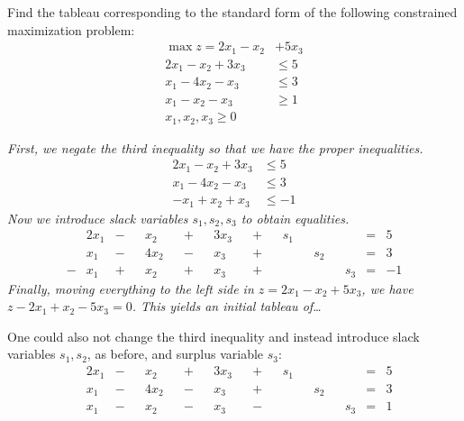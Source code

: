 \documentclass[12pt,letterpaper]{exam}
\begin{document}
\begin{questions}
\newpage
\question[10] Find the tableau corresponding to the standard form of the following constrained maximization problem:
	\[
	\begin{aligned}
	\max z= 2x_1 - x_2& + 5x_3 \\
	2x_1 - x_2 + 3x_3&\leq 5 \\
	x_1 - 4x_2 - x_3&\leq 3 \\
	x_1 - x_2 - x_3&\geq 1 \\
	x_1, x_2, x_3 \geq 0
	\end{aligned}
	\] \pspace

{\itshape First, we negate the third inequality so that we have the proper inequalities. 
	\[
	\begin{aligned}
	2x_1 - x_2 + 3x_3&\leq 5 \\
	x_1 - 4x_2 - x_3&\leq 3 \\
	-x_1 + x_2 + x_3&\leq -1
	\end{aligned}
	\]
Now we introduce slack variables $s_1, s_2, s_3$ to obtain equalities. 
	\[
	\begin{aligned}
	&2x_1 &-& &x_2& &+& &3x_3& &+& &s_1&&&&&=& 5 \\
	&x_1 &-& &4x_2& &-& &x_3& &+& &&&s_2&&&=& 3 \\
	-&x_1 &+& &x_2& &+& &x_3& &+& &&&&&s_3&=& -1
	\end{aligned}
	\]
Finally, moving everything to the left side in $z= 2x_1 - x_2 + 5x_3$, we have $z - 2x_1 + x_2 - 5x_3= 0$. This yields an initial tableau of\dots \par
	\begin{table}[!ht]
	\centering
	\end{table} \par
One could also not change the third inequality and instead introduce slack variables $s_1, s_2$, as before, and surplus variable $s_3$:
	\[
	\begin{aligned}
	&2x_1 &-& &x_2& &+& &3x_3& &+& &s_1&&&&&=& 5 \\
	&x_1 &-& &4x_2& &-& &x_3& &+& &&&s_2&&&=& 3 \\
	&x_1 &-& &x_2& &-& &x_3& &-& &&&&&s_3&=& 1

\end{aligned}\]}
\end{questions}
\end{document}
